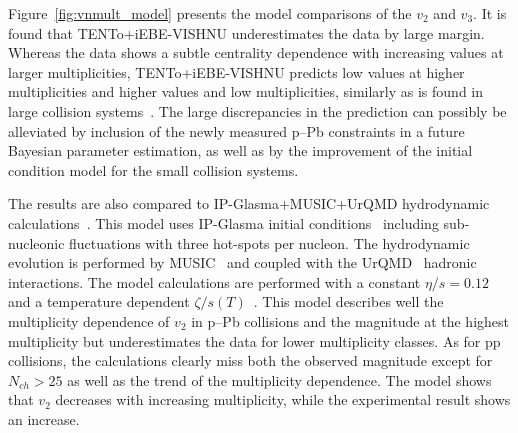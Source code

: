 Figure~\ref{fig:vnmult_model} presents the model comparisons of the $v_2$ and $v_3$. It is found that {TENTo}+iEBE-VISHNU underestimates the data by large margin. Whereas the data shows a subtle centrality dependence with increasing values at larger multiplicities, {TENTo}+iEBE-VISHNU predicts low values at higher multiplicities and higher values and low multiplicities, similarly as is found in large collision systems~\cite{Acharya:2020taj}. The large discrepancies in the prediction can possibly be alleviated by inclusion of the newly measured p--Pb constraints in a future Bayesian parameter estimation, as well as by the improvement of the initial condition model for the small collision systems.

The results are also compared to IP-Glasma+MUSIC+UrQMD hydrodynamic calculations~\cite{Schenke:2020mbo}. This model uses IP-Glasma initial conditions~\cite{Schenke:2012wb} including sub-nucleonic fluctuations with three hot-spots per nucleon. The hydrodynamic evolution is performed by MUSIC~\cite{Schenke:2010rr} and coupled with the UrQMD~\cite{Bass:1998ca,Bleicher:1999xi} hadronic interactions. 
The model calculations are performed with a constant $\eta/s=0.12$ and a temperature dependent $\zeta/s(T)$~\cite{Rose:2020lfc}. 
This model describes well the multiplicity dependence of $v_2$ in p--Pb collisions and the magnitude at the highest multiplicity but underestimates the data for lower multiplicity classes. As for pp collisions, the calculations clearly miss both the observed magnitude except for $N_{ch}>25$ as well as the trend of the multiplicity dependence. The model shows that $v_2$ decreases with increasing multiplicity, while the experimental result shows an increase.

